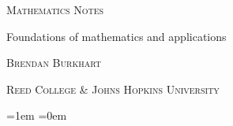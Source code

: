 \documentclass[oneside,openany]{memoir}
\begin{document}
\begin{titlingpage}
    \centering
    \vspace*{1cm}
    {\scshape\Huge Mathematics Notes \par}
    \vspace{1cm}
    {\LARGE Foundations of mathematics and applications \par}
    \vfill
    \vfill
    \begin{tikzpicture}
        
    \end{tikzpicture}
    \vfill
    \vfill
    \vfill
    {\scshape\large Brendan Burkhart \par}
    \vspace{0.5cm}
    {\scshape Reed College \& Johns Hopkins University \par}
    \vspace{0.5cm}
    {\scshape \number\year \par}
    \vfill
\end{titlingpage}

\tableofcontents

\parskip=1em
\parindent=0em

%
%

%
%
%



%
%
%
%

%
%
%
%
\end{document}
